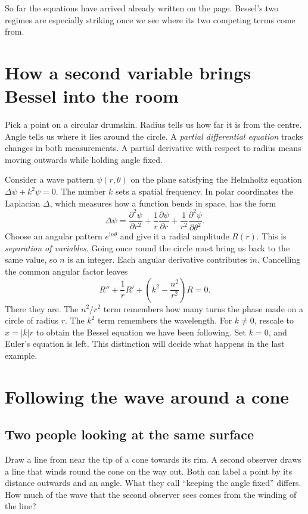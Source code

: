 \documentclass[11pt,a4paper]{amsart}
\newcommand{\ii}{\mathrm{i}}
\theoremstyle{definition}
\theoremstyle{remark}
\begin{document}
So far the equations have arrived already written on the page. Bessel's two regimes are especially striking once we see where its two competing terms come from.

\section{How a second variable brings Bessel into the room}\label{sec:pde}
Pick a point on a circular drumskin. Radius tells us how far it is from the centre. Angle tells us where it lies around the circle. A \emph{partial differential equation} tracks changes in both measurements. A partial derivative with respect to radius means moving outwards while holding angle fixed.

Consider a wave pattern \(\psi(r,\theta)\) on the plane satisfying the Helmholtz equation \(\Delta\psi+k^2\psi=0\). The number \(k\) sets a spatial frequency. In polar coordinates the Laplacian \(\Delta\), which measures how a function bends in space, has the form
\[
 \Delta\psi=\frac{\partial^2\psi}{\partial r^2}
  +\frac{1}{r}\frac{\partial\psi}{\partial r}
  +\frac{1}{r^2}\frac{\partial^2\psi}{\partial\theta^2}.
\]
Choose an angular pattern \(e^{\ii n\theta}\) and give it a radial amplitude \(R(r)\). This is \emph{separation of variables}. Going once round the circle must bring us back to the same value, so \(n\) is an integer. Each angular derivative contributes \(\ii n\). Cancelling the common angular factor leaves
\[
 R''+\frac1r R'+\left(k^2-\frac{n^2}{r^2}\right)R=0.
\]
There they are. The \(n^2/r^2\) term remembers how many turns the phase made on a circle of radius \(r\). The \(k^2\) term remembers the wavelength. For \(k\ne0\), rescale to \(x=|k|r\) to obtain the Bessel equation we have been following. Set \(k=0\), and Euler's equation is left. This distinction will decide what happens in the last example.

\section{Following the wave around a cone}\label{sec:coupled}
\subsection{Two people looking at the same surface}
Draw a line from near the tip of a cone towards its rim. A second observer draws a line that winds round the cone on the way out. Both can label a point by its distance outwards and an angle. What they call “keeping the angle fixed” differs. How much of the wave that the second observer sees comes from the winding of the line?
\end{document}
